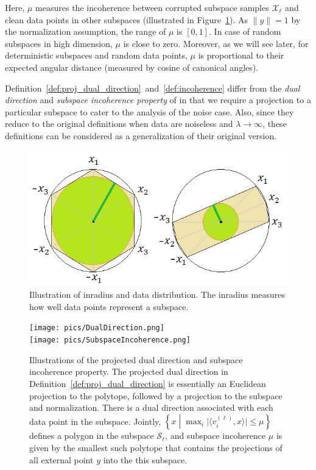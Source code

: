 \documentclass[twoside,11pt]{article}
\numberwithin{equation}{section}
\def\cS{\mathcal{S}}
\begin{document}
Here, $\mu$ measures the incoherence between corrupted subspace samples $\mathcal{X}_{\ell}$ and clean data points in other subspaces (illustrated in Figure~\ref{fig:SubspaceIncoherence}). As $\|y\|=1$ by the normalization assumption, the range of $\mu$ is $[0,1]$. In case of random subspaces in high dimension, $\mu$ is close to zero. Moreover, as we will see later, for deterministic subspaces and random data points, $\mu$ is proportional to their expected angular distance (measured by cosine of canonical angles).

Definition~\ref{def:proj_dual_direction}~and~\ref{def:incoherence} differ from the \emph{dual direction} and \emph{subspace incoherence property} of \citet{soltanolkotabi2011geometric} in that we require a projection to a particular subspace to cater to the analysis of the noise case. Also, since they reduce to the original definitions when data are noiseless and $\lambda\rightarrow \infty$, these definitions can be considered as a generalization of their original version.

%
\begin{figure}
  \centering
      \includegraphics[width=0.7\linewidth]{pics/inradius.png}\\
  \caption{Illustration of inradius and data distribution. The inradius measures how well data points represent a subspace. }\label{fig:inradius}
  \texttt{[image: pics/DualDirection.png]}\\
  \texttt{[image: pics/SubspaceIncoherence.png]}
  \caption{Illustrations of the projected dual direction and subspace incoherence property. The projected dual direction in Definition~\ref{def:proj_dual_direction} is essentially an Euclidean projection to the polytope, followed by a projection to the subspace and normalization. There is a dual direction associated with each data point in the subspace. Jointly, $\left\{x \middle| \max_{i}\big|\langle v_i^{(\ell)},x\rangle\big|\leq \mu\right\}$ defines a polygon in the subspace $\cS_\ell$, and subspace incoherence $\mu$ is given by the smallest such polytope that contains the projections of all external point $y$ into the this subspace.}\label{fig:SubspaceIncoherence}
\end{figure}
\end{document}
